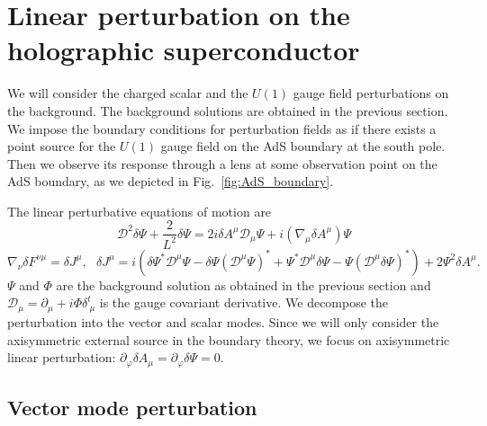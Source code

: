\documentclass[a4paper,11pt]{article}
\begin{document}
\section{Linear perturbation on the holographic superconductor}
\label{sec:perturbation}


    We will consider the charged scalar and the $U(1)$ gauge field perturbations on the background. The background solutions are obtained in the previous section. We impose the boundary conditions for perturbation fields as if there exists a point source for the $U(1)$ gauge field on the AdS boundary at the south pole. Then we observe its response through a lens at some observation point on the AdS boundary, as we depicted in Fig.~\ref{fig:AdS_boundary}. 

    The linear perturbative equations of motion are
    \begin{equation}
        \label{eq:perturbation_EoM_scalar}
        \mathcal{D}^2\delta \Psi +\frac{2}{L^2}\delta \Psi=2i \delta A^\mu\mathcal{D}_\mu\Psi+i(\nabla_\mu\delta A^\mu)\Psi
    \end{equation}
    \begin{equation}
        \label{eq:perturbation_EoM_gauge}
        \nabla_\nu \delta F^{\nu\mu}=\delta J^\mu,
        \ \ \ 
        \delta J^\mu = i(\delta \Psi^* \mathcal{D}^\mu \Psi - \delta \Psi (\mathcal{D}^\mu \Psi)^*  + \Psi^* \mathcal{D}^\mu \delta \Psi  - \Psi (\mathcal{D}^\mu \delta\Psi)^* ) + 2\Psi^2 \delta A^\mu.
    \end{equation}
    $\Psi$ and $\Phi$ are the background solution as obtained in the previous section and $\mathcal{D}_\mu=\partial_\mu+i \Phi \delta^t_{\ \mu}$ is the gauge covariant derivative. 
    We decompose the perturbation into the vector and scalar modes.
    Since we will only consider the axisymmetric external source in the boundary theory, 
    we focus on axisymmetric linear perturbation: $\partial_\varphi \delta A_\mu=\partial_\varphi \delta\Psi = 0$.


\subsection{Vector mode perturbation}
\end{document}
